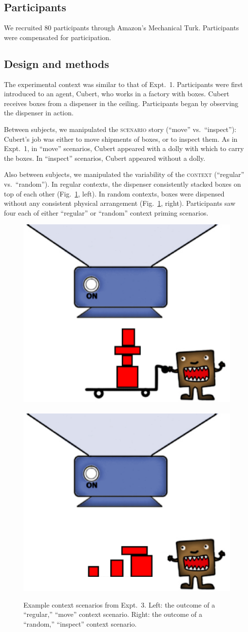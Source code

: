 \documentclass[linguex]{sp}
\begin{document}
\subsection{Participants}

We recruited 80 participants through Amazon's Mechanical Turk. Participants were compensated for participation.

\subsection{Design and methods}

The experimental context was similar to that of Expt.~1. Participants were first introduced to an agent, Cubert, who works in a factory with boxes. Cubert receives boxes from a dispenser in the ceiling. Participants began by observing the dispenser in action.

Between subjects, we manipulated the \textsc{scenario} story (``move'' vs.~``inspect''): Cubert's job was either to move shipments of boxes, or to inspect them. As in Expt.~1, in ``move'' scenarios, Cubert appeared with a dolly with which to carry the boxes. In ``inspect'' scenarios, Cubert appeared without a dolly.

Also between subjects, we manipulated the variability of the \textsc{context} (``regular'' vs.~``random''). In regular contexts, the dispenser consistently stacked boxes on top of each other (Fig.~\ref{expt2context}, left). In random contexts, boxes were dispensed without any consistent physical arrangement (Fig.\ \ref{expt2context}, right). Participants saw four each of either ``regular'' or ``random'' context priming scenarios.

\begin{figure}[h]
\centering
\includegraphics[width=.45\textwidth]{images/context13reg.eps}
\ \ \ \ 
\includegraphics[width=.45\textwidth]{images/context13nodolly.eps}
\caption{Example context scenarios from Expt.~3. Left: the outcome of a ``regular,'' ``move'' context scenario. Right: the outcome of a ``random,'' ``inspect'' context scenario.\label{expt2context}}
\end{figure}
\end{document}
